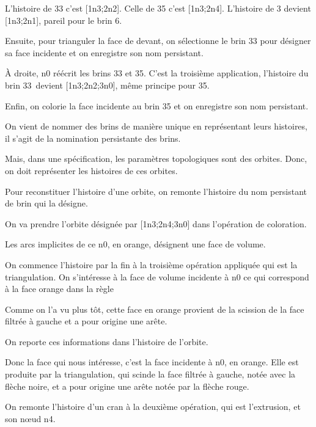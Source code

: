 \documentclass[a4paper]{article}
\begin{document}
L'histoire de 33 c'est [1n3;2n2]. %
Celle de 35 c'est [1n3;2n4]. %
L'histoire de 3 devient [1n3;2n1], pareil pour le brin 6. %

Ensuite, pour trianguler la face de devant, on sélectionne le brin 33 pour désigner sa face incidente et on enregistre son nom persistant.

À droite, n0 réécrit les brins 33 et 35.
C'est la troisième application, l'histoire du brin 33 devient [1n3;2n2;3n0], même principe pour 35.%

Enfin, on colorie la face incidente au brin 35 et on enregistre son nom persistant.

On vient de nommer des brins de manière unique en représentant leurs histoires,
il s'agit de la nomination persistante des brins.

Mais, dans une spécification, les paramètres topologiques sont des orbites.
Donc, on doit représenter les histoires de ces orbites.






Pour reconstituer l'histoire d'une orbite, on remonte
l'histoire du nom persistant de brin qui la désigne.

On va prendre l'orbite désignée par [1n3;2n4;3n0] dans l'opération de coloration.

Les arcs implicites de ce n0, en orange, désignent une face de volume.

On commence l'histoire par la fin à la troisième opération appliquée qui est la triangulation.
On s'intéresse à la face de volume incidente à n0 ce qui correspond à la face orange dans la règle

Comme on l'a vu plus tôt, cette face en orange provient de la scission de la face filtrée à gauche et a pour origine une arête.

On reporte ces informations dans l'histoire de l'orbite.

Donc la face qui nous intéresse, c'est la face incidente à n0, en orange.
Elle est produite par la triangulation, qui scinde la face filtrée à gauche, notée avec la flèche noire, et a pour origine une arête notée par la flèche rouge.

On remonte l'histoire d'un cran à la deuxième opération, qui est l'extrusion, et son nœud n4.
\end{document}

